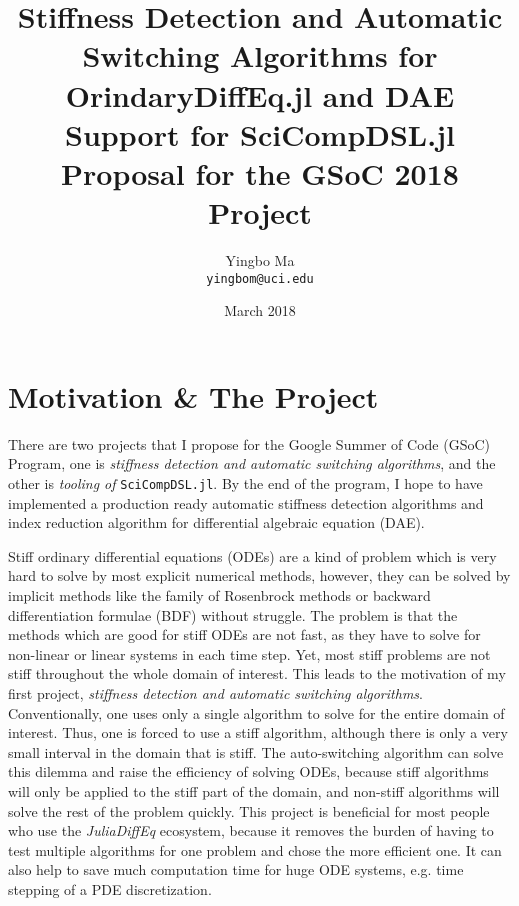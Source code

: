 \documentclass[12pt]{article}
\author{Yingbo Ma\\ \tt{yingbom@uci.edu}}
\date{March 2018}
\title{Stiffness Detection and Automatic Switching Algorithms for
OrindaryDiffEq.jl and DAE Support for SciCompDSL.jl \\
\large{Proposal for the GSoC 2018 Project}}
\begin{document}
\maketitle
\tableofcontents

\section{Motivation \& The Project}
There are two projects that I propose for the Google Summer of Code (GSoC)
Program, one is \textit{stiffness detection and automatic switching
algorithms}, and the other is \textit{tooling of} \texttt{SciCompDSL.jl}. By
the end of the program, I hope to have implemented a production ready automatic
stiffness detection algorithms and index reduction algorithm for differential
algebraic equation (DAE).

Stiff ordinary differential equations (ODEs) are a kind of problem which is
very hard to solve by most explicit numerical methods, however, they can be
solved by implicit methods like the family of Rosenbrock methods or backward
differentiation formulae (BDF) without struggle. The problem is that the
methods which are good for stiff ODEs are not fast, as they have to solve for
non-linear or linear systems in each time step. Yet, most stiff problems are
not stiff throughout the whole domain of interest. This leads to the motivation
of my first project, \textit{stiffness detection and automatic switching
algorithms}. Conventionally, one uses only a single algorithm to solve for the
entire domain of interest. Thus, one is forced to use a stiff algorithm, although
there is only a very small interval in the domain that is stiff. The
auto-switching algorithm can solve this dilemma and raise the efficiency of
solving ODEs, because stiff algorithms will only be applied to the stiff part
of the domain, and non-stiff algorithms will solve the rest of the problem
quickly. This project is beneficial for most people who use the
\textit{JuliaDiffEq} ecosystem, because it removes the burden of having to test
multiple algorithms for one problem and chose the more efficient one. It can
also help to save much computation time for huge ODE systems, e.g. time
stepping of a PDE discretization.
\end{document}
